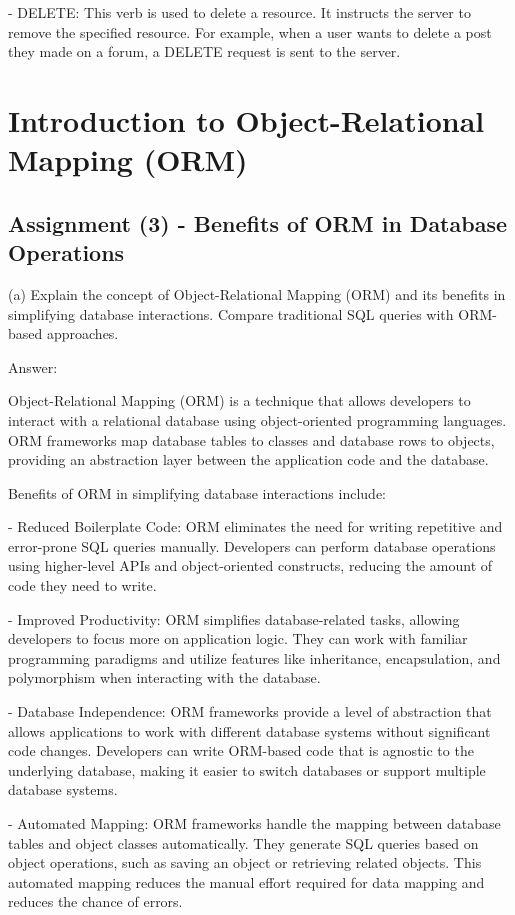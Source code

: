 \documentclass{article}
\begin{document}
- DELETE: This verb is used to delete a resource. It instructs the server to remove the specified resource. For example, when a user wants to delete a post they made on a forum, a DELETE request is sent to the server.

\section*{Introduction to Object-Relational Mapping (ORM)}

\subsection*{Assignment (3) - Benefits of ORM in Database Operations}

(a) Explain the concept of Object-Relational Mapping (ORM) and its benefits in simplifying database interactions. Compare traditional SQL queries with ORM-based approaches.

Answer:

Object-Relational Mapping (ORM) is a technique that allows developers to interact with a relational database using object-oriented programming languages. ORM frameworks map database tables to classes and database rows to objects, providing an abstraction layer between the application code and the database.

Benefits of ORM in simplifying database interactions include:

- Reduced Boilerplate Code: ORM eliminates the need for writing repetitive and error-prone SQL queries manually. Developers can perform database operations using higher-level APIs and object-oriented constructs, reducing the amount of code they need to write.

- Improved Productivity: ORM simplifies database-related tasks, allowing developers to focus more on application logic. They can work with familiar programming paradigms and utilize features like inheritance, encapsulation, and polymorphism when interacting with the database.

- Database Independence: ORM frameworks provide a level of abstraction that allows applications to work with different database systems without significant code changes. Developers can write ORM-based code that is agnostic to the underlying database, making it easier to switch databases or support multiple database systems.

- Automated Mapping: ORM frameworks handle the mapping between database tables and object classes automatically. They generate SQL queries based on object operations, such as saving an object or retrieving related objects. This automated mapping reduces the manual effort required for data mapping and reduces the chance of errors.
\end{document}
